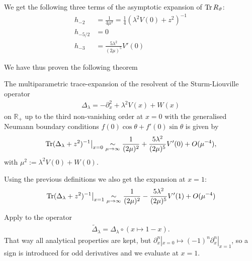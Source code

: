We get the following three terms of the asymptotic expansion of $\operatorname{Tr} R_\vartheta$:
\begin{align}
  h_{-2} &= \frac{1}{4\mu^2} = \frac{1}{4} (\lambda^2V(0) + z^2)^{-1} \\
  h_{-5/2} &= 0 \\
  h_{-3} &= \frac{5\lambda^2}{(2\mu)^5} V'(0)
\end{align}

We have thus proven the following theorem
\begin{MainTheorem}
  \label{main:boundary}
  The multiparametric trace-expansion of the resolvent of the Sturm-Liouville
  operator
  \begin{align*}
    \Delta_\lambda = -\partial_x^2 + \lambda^2 V(x) + W(x)
  \end{align*}
  on $\mathbb{R_+}$ up to the third non-vanishing order at $x=0$ with the
  generalised Neumann boundary conditions $f(0)\cos\theta + f'(0)\sin\theta$ is
  given by
  \begin{align*}
    \left.\operatorname{Tr}(\Delta_\lambda + z^2)^{-1}\right|_{x=0} \mathrel{\underset{\mu\to\infty}{\sim}}
    \frac{1}{(2\mu)^2} + \frac{5\lambda^2}{(2\mu)^5} V'(0) + O(\mu^{-4}),
  \end{align*}
  with $\mu^2 := \lambda^2 V(0) + W(0)$.
  \begin{Corollary}
    \label{cor:boundary}
    Using the previous definitions we also get the expansion at $x = 1$:
    \begin{align*}
      \left.\operatorname{Tr}(\Delta_\lambda + z^2)^{-1}\right|_{x=1} \mathrel{\underset{\mu\to\infty}{\sim}}
      \frac{1}{(2\mu)^2} - \frac{5\lambda^2}{(2\mu)^5} V'(1) + O(\mu^{-4})
    \end{align*}
    \begin{Proof}
      Apply  to the operator
      \begin{align*}
        \tilde\Delta_\lambda = \Delta_\lambda\circ(x\mapsto 1-x).
      \end{align*}
      That way all analytical properties are kept, but $\partial_x^n|_{x=0}
      \mapsto (-1)^n \partial_x^n|_{x=1}$, so a sign is introduced for odd
      derivatives and we evaluate at $x=1$.
    \end{Proof}
  \end{Corollary}
\end{MainTheorem}
